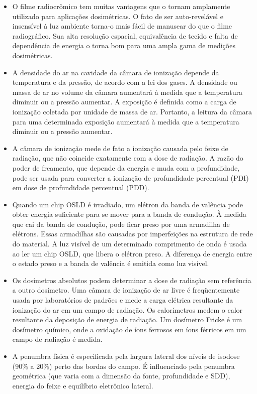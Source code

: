 \documentclass[11pt,a4paper]{article}
\begin{document}
\begin{itemize}
    \item O filme radiocrômico tem muitas vantagens que o tornam amplamente utilizado para aplicações dosimétricas. O fato de ser auto-revelável e insensível à luz ambiente torna-o mais fácil de manusear do que o filme radiográfico. Sua alta resolução espacial, equivalência de tecido e falta de dependência de energia o torna bom para uma ampla gama de medições dosimétricas.
    
    \item A densidade do ar na cavidade da câmara de ionização depende da temperatura e da pressão, de acordo com a lei dos gases. A densidade ou massa de ar no volume da câmara aumentará à medida que a temperatura diminuir ou a pressão aumentar. A exposição é definida como a carga de ionização coletada por unidade de massa de ar. Portanto, a leitura da câmara para uma determinada exposição aumentará à medida que a temperatura diminuir ou a pressão aumentar.
    
    \item A câmara de ionização mede de fato a ionização causada pelo feixe de radiação, que não coincide exatamente com a dose de radiação. A razão do poder de freamento, que depende da energia e muda com a profundidade, pode ser usada para converter a ionização de profundidade percentual (PDI) em dose de profundidade percentual (PDD).
    
    \item Quando um chip OSLD é irradiado, um elétron da banda de valência pode obter energia suficiente para se mover para a banda de condução. À medida que cai da banda de condução, pode ficar preso por uma armadilha de elétrons. Essas armadilhas são causadas por imperfeições na estrutura de rede do material. A luz visível de um determinado comprimento de onda é usada ao ler um chip OSLD, que libera o elétron preso. A diferença de energia entre o estado preso e a banda de valência é emitida como luz visível.
    
    \item Os dosímetros absolutos podem determinar a dose de radiação sem referência a outro dosímetro. Uma câmara de ionização de ar livre é freqüentemente usada por laboratórios de padrões e mede a carga elétrica resultante da ionização do ar em um campo de radiação. Os calorímetros medem o calor resultante da deposição de energia de radiação. Um dosímetro Fricke é um dosímetro químico, onde a oxidação de íons ferrosos em íons férricos em um campo de radiação é medida.
    
    \item A penumbra física é especificada pela largura lateral dos níveis de isodose (90\% a 20\%) perto das bordas do campo. É influenciado pela penumbra geométrica (que varia com a dimensão da fonte, profundidade e SDD), energia do feixe e equilíbrio eletrônico lateral.
\end{itemize}
\end{document}
